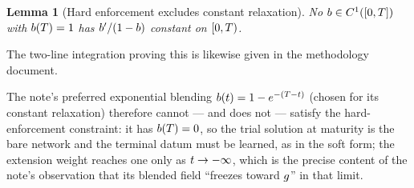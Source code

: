 \documentclass[11pt]{article}
\theoremstyle{plain}
\newtheorem{lemma}[theorem]{Lemma}
\theoremstyle{definition}
\theoremstyle{remark}
\begin{document}
\begin{lemma}[Hard enforcement excludes constant relaxation]\label{lem:relax}
No $b\in C^{1}([0,T])$ with
$b(T)=1$ has
$b'/(1-b)$ constant on
$[0,T)$.
\end{lemma}
The two-line integration proving this is likewise given in the methodology
document.

The note's preferred exponential blending
$b(t)=1-e^{-(T-t)}$ (chosen for its constant
relaxation) therefore cannot --- and does not --- satisfy the hard-enforcement
constraint: it has $b(T)=0$, so the trial solution at maturity is the
bare network and the terminal datum must be learned, as in the soft form; the
extension weight reaches one only as $t\to-\infty$, which is the precise
content of the note's observation that its blended field ``freezes toward
$g$'' in that limit.
\end{document}
